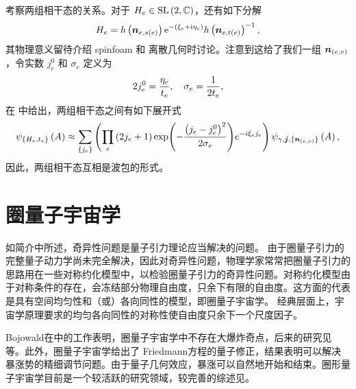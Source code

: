 		考察两组相干态的关系。对于 $H_e \in \mathrm{SL}\left( 2,\mathbb{C} \right)$，还有如下分解
		\begin{equation}
			H_e = h\left(\vb*{n}_{e,s(e)}\right) \mathrm{e}^{-(\xi_e+\mathrm{i} \eta_e)} h\left(\vb*{n}_{e,t(e)}\right)^{-1},
		\end{equation}
		其物理意义留待介绍 spinfoam 和 离散几何时讨论。注意到这给了我们一组 $\vb*{n}_{(e,v)}$，令实数 $j_e^0$ 和 $\sigma_e$ 定义为
		\begin{equation}
			2j_e^0 = \frac{\eta_e}{t_e} \qc \sigma_e = \frac{1}{2t_e},
		\end{equation}
		在\cite{Bianchi2009} 中给出，两组相干态之间有如下展开式
		\begin{equation}
			\psi_{\{H_e,t_e\}}\left(A\right) \approx \sum_{\{j_e\}}\left(\prod_{e}\left(2 j_{e}+1\right) \exp(-\frac{\left(j_{e}-j_{e}^{0}\right)^{2}}{2 \sigma_{e}}) e^{-i \xi_{e} j_{e}}\right) \psi_{\gamma, \vb*{j}, \{\vb*{n}_{(e,v)}\}}\left(A\right),
		\end{equation}
		因此，两组相干态互相是波包的形式。

	\section{圈量子宇宙学}

		如简介中所述，奇异性问题是量子引力理论应当解决的问题。
		由于圈量子引力的完整量子动力学尚未完全解决，因此对奇异性问题，物理学家常常把圈量子引力的思路用在一些对称约化模型中，以检验圈量子引力的奇异性问题。对称约化模型由于对称条件的存在，会冻结部分物理自由度，只余下有限的自由度\cite{Bojowald:1999eh}。这方面的代表是具有空间均匀性和（或）各向同性的模型，即圈量子宇宙学。 经典层面上，宇宙学原理要求的均匀各向同性的对称性使自由度只余下一个尺度因子。
		
		Bojowald在\cite{Bojowald:2001xe}中的工作表明，圈量子宇宙学中不存在大爆炸奇点，后来的研究见\cite{Ashtekar:2003hd}等。此外，圈量子宇宙学给出了 Friedmann方程的量子修正，结果表明可以解决暴涨势的精细调节问题。由于量子几何效应，暴涨可以自然地开始和结束\cite{Bojowald:2002nz,Date:2004yz}。圈形量子宇宙学目前是一个较活跃的研究领域，较完善的综述见\cite{Ashtekar:2011ni}。
